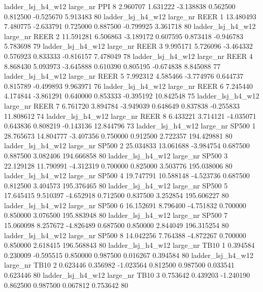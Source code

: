   ladder_lsj_h4_w12   large_nr      PPI                 8  2.960707  1.631222  -3.138838 0.562500 0.812500 -0.525670    5.913483 80
  ladder_lsj_h4_w12   large_nr     REER                 1 13.480493  7.480775  -2.633791 0.725000 0.887500 -0.799925    3.361718 80
  ladder_lsj_h4_w12   large_nr     REER                 2 11.591281  6.506863  -3.189172 0.607595 0.873418 -0.946783    5.783698 79
  ladder_lsj_h4_w12   large_nr     REER                 3  9.995171  5.726096  -3.464332 0.576923 0.833333 -0.816157    7.478049 78
  ladder_lsj_h4_w12   large_nr     REER                 4  8.868430  5.093973  -3.645888 0.610390 0.805195 -0.674838    8.845088 77
  ladder_lsj_h4_w12   large_nr     REER                 5  7.992312  4.585466  -3.774976 0.644737 0.815789 -0.499893    9.963971 76
  ladder_lsj_h4_w12   large_nr     REER                 6  7.245440  4.174844  -3.861291 0.640000 0.853333 -0.395192   10.842548 75
  ladder_lsj_h4_w12   large_nr     REER                 7  6.761720  3.894784  -3.949039 0.648649 0.837838 -0.255833   11.808612 74
  ladder_lsj_h4_w12   large_nr     REER                 8  6.433221  3.714121  -4.035071 0.643836 0.808219 -0.143136   12.844796 73
  ladder_lsj_h4_w12   large_nr    SP500                 1 28.765673 14.804777  -3.407356 0.750000 0.912500  2.722357  194.429881 80
  ladder_lsj_h4_w12   large_nr    SP500                 2 25.034833 13.061688  -3.984754 0.687500 0.887500  3.082406  194.666858 80
  ladder_lsj_h4_w12   large_nr    SP500                 3 22.129128 11.790991  -4.312319 0.700000 0.825000  3.503776  195.038006 80
  ladder_lsj_h4_w12   large_nr    SP500                 4 19.747791 10.588148  -4.523736 0.687500 0.812500  3.404573  195.376465 80
  ladder_lsj_h4_w12   large_nr    SP500                 5 17.645415  9.510397  -4.652918 0.712500 0.837500  3.252854  195.606227 80
  ladder_lsj_h4_w12   large_nr    SP500                 6 16.152691  8.796400  -4.751832 0.700000 0.850000  3.076500  195.883948 80
  ladder_lsj_h4_w12   large_nr    SP500                 7 15.060098  8.257672  -4.826489 0.687500 0.850000  2.844049  196.315254 80
  ladder_lsj_h4_w12   large_nr    SP500                 8 14.042256  7.764388  -4.872267 0.700000 0.850000  2.618415  196.568843 80
  ladder_lsj_h4_w12   large_nr     TB10                 1  0.394584  0.230009  -0.595515 0.850000 0.987500  0.016267    0.394584 80
  ladder_lsj_h4_w12   large_nr     TB10                 2  0.623446  0.356982  -1.023564 0.812500 0.987500  0.033541    0.623446 80
  ladder_lsj_h4_w12   large_nr     TB10                 3  0.753642  0.439203  -1.240190 0.862500 0.987500  0.067812    0.753642 80
